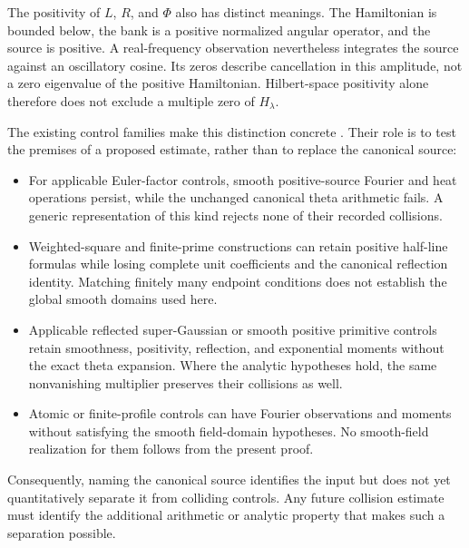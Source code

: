 The positivity of $L$, $R$, and $\Phi$ also has distinct meanings.
The Hamiltonian is bounded below, the bank is a positive normalized
angular operator, and the source is positive. A real-frequency
observation nevertheless integrates the source against an oscillatory
cosine. Its zeros describe cancellation in this amplitude, not a zero
eigenvalue of the positive Hamiltonian. Hilbert-space positivity alone
therefore does not exclude a multiple zero of $H_\lambda$.

The existing control families make this distinction concrete
\cite{CollisionControls}. Their role is to test the premises of a
proposed estimate, rather than to replace the canonical source:
\begin{itemize}
\item For applicable Euler-factor controls, smooth positive-source
Fourier and heat operations persist, while the unchanged canonical
theta arithmetic fails. A generic representation of this kind rejects
none of their recorded collisions.
\item Weighted-square and finite-prime constructions can retain
positive half-line formulas while losing complete unit coefficients
and the canonical reflection identity. Matching finitely many endpoint
conditions does not establish the global smooth domains used here.
\item Applicable reflected super-Gaussian or smooth positive primitive
controls retain smoothness, positivity, reflection, and exponential
moments without the exact theta expansion. Where the analytic
hypotheses hold, the same nonvanishing multiplier preserves their
collisions as well.
\item Atomic or finite-profile controls can have Fourier observations
and moments without satisfying the smooth field-domain hypotheses.
No smooth-field realization for them follows from the present proof.
\end{itemize}
Consequently, naming the canonical source identifies the input but
does not yet quantitatively separate it from colliding controls.
Any future collision estimate must identify the additional arithmetic
or analytic property that makes such a separation possible.
